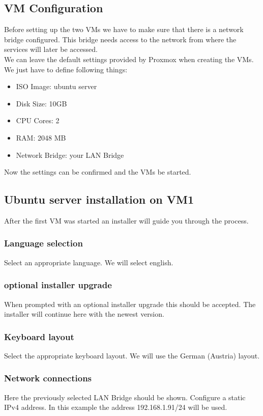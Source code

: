 \documentclass[10pt,a4paper]{article}
\begin{document}
\subsection{VM Configuration}
Before setting up the two VMs we have to make sure that there is a network bridge configured. This bridge needs access to the network from where the services will later be accessed.
\\
We can leave the default settings provided by Proxmox when creating the VMs. We just have to define following things:
\begin{itemize}
\item ISO Image: ubuntu server
\item Disk Size: 10GB
\item CPU Cores: 2
\item RAM: 2048 MB
\item Network Bridge: your LAN Bridge
\end{itemize}
Now the settings can be confirmed and the VMs be started.

\subsection{Ubuntu server installation on VM1}
\label{serverinstallation}
After the first VM was started an installer will guide you through the process.

\subsubsection{Language selection}
Select an appropriate language. We will select english.

\subsubsection{optional installer upgrade}
When prompted with an optional installer upgrade this should be accepted. The installer will continue here with the newest version.

\subsubsection{Keyboard layout}
Select the appropriate keyboard layout. We will use the German (Austria) layout.

\subsubsection{Network connections}
\label{networkconnections}
Here the previously selected LAN Bridge should be shown. Configure a static IPv4 address. In this example the address 192.168.1.91/24 will be used. 
\end{document}
